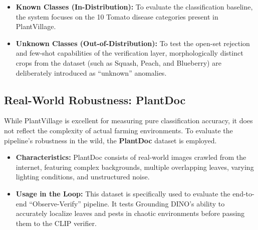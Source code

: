 \begin{itemize}
	\item \textbf{Known Classes (In-Distribution):} To evaluate the classification baseline, the system focuses on the 10 Tomato disease categories present in PlantVillage.
	\item \textbf{Unknown Classes (Out-of-Distribution):} To test the open-set rejection and few-shot capabilities of the verification layer, morphologically distinct crops from the dataset (such as Squash, Peach, and Blueberry) are deliberately introduced as ``unknown'' anomalies.
\end{itemize}

\subsection{Real-World Robustness: PlantDoc}
While PlantVillage is excellent for measuring pure classification accuracy, it does not reflect the complexity of actual farming environments. To evaluate the pipeline's robustness in the wild, the \textbf{PlantDoc} dataset \cite{DBLP:journals/corr/abs-1911-10317} is employed. 

\begin{itemize}
	\item \textbf{Characteristics:} PlantDoc consists of real-world images crawled from the internet, featuring complex backgrounds, multiple overlapping leaves, varying lighting conditions, and unstructured noise.
	\item \textbf{Usage in the Loop:} This dataset is specifically used to evaluate the end-to-end ``Observe-Verify'' pipeline. It tests Grounding DINO's ability to accurately localize leaves and pests in chaotic environments before passing them to the CLIP verifier.
\end{itemize}
